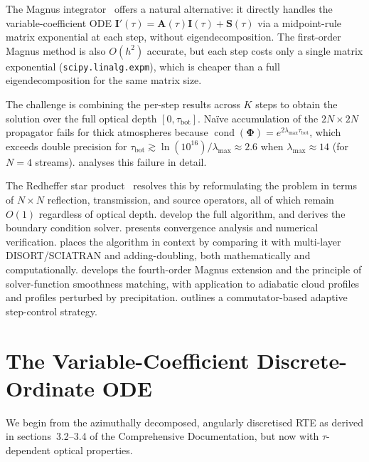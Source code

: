 \documentclass[11pt,a4paper]{article}
\newcommand{\cond}{\operatorname{cond}}
\newcommand{\vect}[1]{\bm{#1}}
\newcommand{\mat}[1]{\mathbf{#1}}
\newcommand{\tbot}{\tau_{\mathrm{bot}}}
\theoremstyle{definition}
\begin{document}
The Magnus integrator~\cite{magnus1954,blanes2009} offers a
natural alternative: it directly handles the variable-coefficient
ODE $\vect{I}'(\tau)=\mat{A}(\tau)\vect{I}(\tau)+\vect{S}(\tau)$ via
a midpoint-rule matrix exponential at each step, without
eigendecomposition.  The first-order Magnus method is also $O(h^2)$
accurate, but each step costs only a single matrix exponential
(\texttt{scipy.linalg.expm}), which is cheaper than a full
eigendecomposition for the same matrix size.

The challenge is combining the per-step results across $K$ steps to
obtain the solution over the full optical depth $[0,\tbot]$.
Na\"ive accumulation of the $2N\!\times\!2N$ propagator fails for
thick atmospheres because $\cond(\mat{\Phi})=
e^{2\lambda_{\max}\tbot}$, which exceeds double precision for
$\tbot\gtrsim\ln(10^{16})/\lambda_{\max}\approx 2.6$ when
$\lambda_{\max}\approx 14$ (for $N\!=\!4$ streams).
 analyses this failure in detail.

The Redheffer star product~\cite{redheffer1962,grant1969}
resolves this by reformulating the problem in terms of
$N\!\times\!N$ reflection, transmission, and source operators,
all of which remain $O(1)$ regardless of optical depth.
 develop the
full algorithm, and  derives the boundary
condition solver.   presents convergence
analysis and numerical verification.
 places the algorithm in context by comparing
it with multi-layer DISORT/SCIATRAN and adding-doubling, both
mathematically and computationally.   develops
the fourth-order Magnus extension and the principle of solver-function
smoothness matching, with application to adiabatic cloud profiles and
profiles perturbed by precipitation.   outlines
a commutator-based adaptive step-control strategy.


\section{The Variable-Coefficient Discrete-Ordinate ODE}\label{sec:ode}

We begin from the azimuthally decomposed, angularly discretised RTE
as derived in sections~3.2--3.4 of the Comprehensive Documentation,
but now with $\tau$-dependent optical properties.
\end{document}
